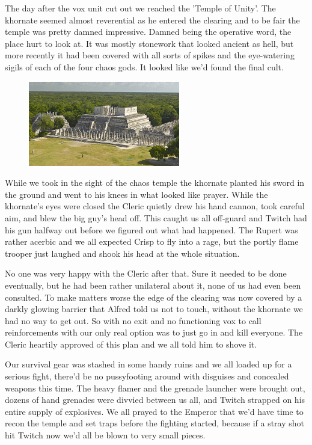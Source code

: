 The day after the vox unit cut out we reached the 'Temple of Unity'. 
The khornate seemed almost reverential as he entered the clearing and to be fair the temple was pretty damned impressive. 
Damned being the operative word, the place hurt to look at. 
It was mostly stonework that looked ancient as hell, but more recently it had been covered with all sorts of spikes and the eye-watering sigils of each of the four chaos gods. 
It looked like we'd found the final cult.

\begin{figure}
	\begin{center}
		\includegraphics[width=\figwidth]{pics/6/37.png}
	\end{center}
\end{figure}
While we took in the sight of the chaos temple the khornate planted his sword in the ground and went to his knees in what looked like prayer. 
While the khornate's eyes were closed the Cleric quietly drew his hand cannon, took careful aim, and blew the big guy's head off. 
This caught us all off-guard and Twitch had his gun halfway out before we figured out what had happened. 
The Rupert was rather acerbic and we all expected Crisp to fly into a rage, but the portly flame trooper just laughed and shook his head at the whole situation.

No one was very happy with the Cleric after that. 
Sure it needed to be done eventually, but he had been rather unilateral about it, none of us had even been consulted. 
To make matters worse the edge of the clearing was now covered by a darkly glowing barrier that Alfred told us not to touch, without the khornate we had no way to get out. 
So with no exit and no functioning vox to call reinforcements with our only real option was to just go in and kill everyone. The Cleric heartily approved of this plan and we all told him to shove it.

Our survival gear was stashed in some handy ruins and we all loaded up for a serious fight, there'd be no pussyfooting around with disguises and concealed weapons this time. The heavy flamer and the grenade launcher were brought out, dozens of hand grenades were divvied between us all, and Twitch strapped on his entire supply of explosives. We all prayed to the Emperor that we'd have time to recon the temple and set traps before the fighting started, because if a stray shot hit Twitch now we'd all be blown to very small pieces.

